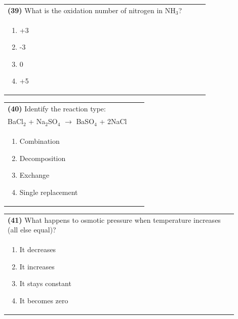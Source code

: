 \documentclass{article}
\begin{document}
\noindent\begin{tabular}{|p{0.9\linewidth}|}
\hline
\textbf{(39)} What is the oxidation number of nitrogen in NH$_3$?\\[0.2cm]
\begin{minipage}[t]{0.85\linewidth}
\begin{enumerate}[label=\alph*.]
\item +3
\item -3
\item 0
\item +5
\end{enumerate}
\end{minipage}\\[0.2cm]
\hline
\end{tabular}

\noindent\begin{tabular}{|p{0.9\linewidth}|}
\hline
\textbf{(40)} Identify the reaction type:\\[0.2cm]
BaCl$_2$ + Na$_2$SO$_4$ $\rightarrow$ BaSO$_4$ + 2NaCl\\[0.2cm]
\begin{minipage}[t]{0.85\linewidth}
\begin{enumerate}[label=\alph*.]
\item Combination
\item Decomposition
\item Exchange
\item Single replacement
\end{enumerate}
\end{minipage}\\[0.2cm]
\hline
\end{tabular}
\newpage


\noindent\begin{tabular}{|p{0.9\linewidth}|}
\hline
\textbf{(41)} What happens to osmotic pressure when temperature increases (all else equal)?\\[0.2cm]
\begin{minipage}[t]{0.85\linewidth}
\begin{enumerate}[label=\alph*.]
\item It decreases
\item It increases
\item It stays constant
\item It becomes zero
\end{enumerate}
\end{minipage}\\[0.2cm]
\hline
\end{tabular}
\end{document}
